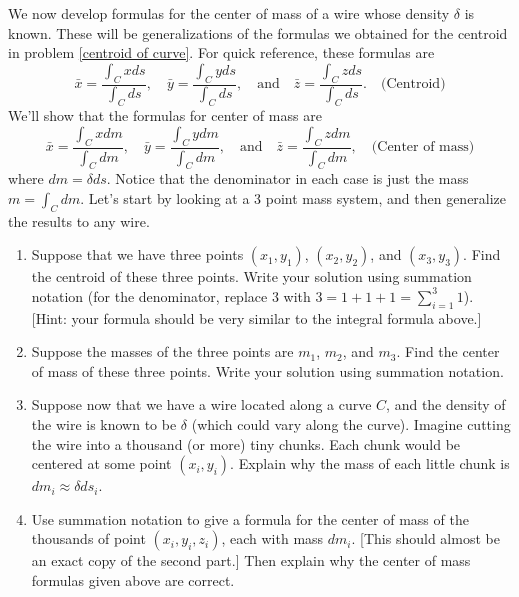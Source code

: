 \begin{problem}\label{center of mass of curve}%
%
We now develop formulas for the center of mass of a wire whose density $\delta$ is known. These will be generalizations of the formulas we obtained for the centroid in problem \ref{centroid of curve}. For quick reference, these formulas are 
$$
\bar x = \frac{\int_C x ds}{\int_C  ds},\quad
\bar y = \frac{\int_C y ds}{\int_C  ds},\quad 
\text{and}\quad
\bar z = \frac{\int_C z ds}{\int_C  ds}.  \quad\text{(Centroid)}
$$
We'll show that the formulas for center of mass are  %
$$
\bar x = \frac{\int_C x dm}{\int_C  dm},\quad
\bar y = \frac{\int_C y dm}{\int_C  dm},\quad 
\text{and}\quad
\bar z = \frac{\int_C z dm}{\int_C  dm},  \quad\text{(Center of mass)}
$$
where $dm=\delta ds$. Notice that the denominator in each case is just the mass $m=\int_C dm$.
Let's start by looking at a 3 point mass system, and then generalize the results to any wire. 
\begin{enumerate}
 \item Suppose that we have three points $(x_1,y_1)$, $(x_2,y_2)$, and $(x_3,y_3)$. Find the centroid of these three points. Write your solution using summation notation (for the denominator, replace 3 with $3=1+1+1=\sum_{i=1}^3 1$). [Hint: your formula should be very similar to the integral formula above.]
 \item Suppose the masses of the three points are $m_1$, $m_2$, and  $m_3$. Find the center of mass of these three points. Write your solution using summation notation.
 \item Suppose now that we have a wire located along a curve $C$, and the density of the wire is known to be $\delta$ (which could vary along the curve). Imagine cutting the wire into a thousand (or more) tiny chunks.  Each chunk would be centered at some point $(x_i,y_i)$. Explain why the mass of each little chunk is $dm_i\approx\delta ds_i$. 
 \item Use summation notation to give a formula for the center of mass of the thousands of point $(x_i,y_i,z_i)$, each with mass $dm_i.$ [This should almost be an exact copy of the second part.] 
 Then explain why the center of mass formulas given above are correct.
\end{enumerate}
 
\end{problem}

